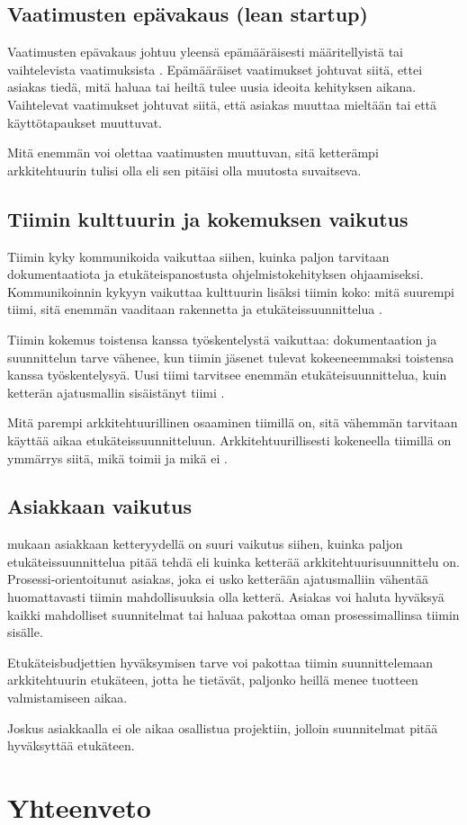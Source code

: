 \section{Vaatimusten epävakaus (lean startup)}
Vaatimusten epävakaus johtuu yleensä epämääräisesti määritellyistä tai vaihtelevista vaatimuksista \citep{waterman_how_2015}. Epämääräiset vaatimukset johtuvat siitä, ettei asiakas tiedä, mitä haluaa tai heiltä tulee uusia ideoita kehityksen aikana. Vaihtelevat vaatimukset johtuvat siitä, että asiakas muuttaa mieltään tai että käyttötapaukset muuttuvat.

Mitä enemmän voi olettaa vaatimusten muuttuvan, sitä ketterämpi arkkitehtuurin tulisi olla eli sen pitäisi olla muutosta suvaitseva.

\section{Tiimin kulttuurin ja kokemuksen vaikutus}
Tiimin kyky kommunikoida vaikuttaa siihen, kuinka paljon tarvitaan dokumentaatiota ja etukäteispanostusta ohjelmistokehityksen ohjaamiseksi. Kommunikoinnin kykyyn vaikuttaa kulttuurin lisäksi tiimin koko: mitä suurempi tiimi, sitä enemmän vaaditaan rakennetta ja etukäteissuunnittelua \citep{waterman_how_2015}.

Tiimin kokemus toistensa kanssa työskentelystä vaikuttaa: dokumentaation ja suunnittelun tarve vähenee, kun tiimin jäsenet tulevat kokeeneemmaksi toistensa kanssa työskentelysyä. Uusi tiimi tarvitsee enemmän etukäteisuunnittelua, kuin ketterän ajatusmallin sisäistänyt tiimi \citep{waterman_how_2015}.

Mitä parempi arkkitehtuurillinen osaaminen tiimillä on, sitä vähemmän tarvitaan käyttää aikaa etukäteissuunnitteluun. Arkkitehtuurillisesti kokeneella tiimillä on ymmärrys siitä, mikä toimii ja mikä ei \citep{waterman_how_2015}.

\section{Asiakkaan vaikutus}
\citep{waterman_how_2015} mukaan asiakkaan ketteryydellä on suuri vaikutus siihen, kuinka paljon etukäteissuunnittelua pitää tehdä eli kuinka ketterää arkkitehtuurisuunnittelu on. Prosessi-orientoitunut asiakas, joka ei usko ketterään ajatusmalliin vähentää huomattavasti tiimin mahdollisuuksia olla ketterä. Asiakas voi haluta hyväksyä kaikki mahdolliset suunnitelmat tai haluaa pakottaa oman prosessimallinsa tiimin sisälle. 

Etukäteisbudjettien hyväksymisen tarve voi pakottaa tiimin suunnittelemaan arkkitehtuurin etukäteen, jotta he tietävät, paljonko heillä menee tuotteen valmistamiseen aikaa. 

Joskus asiakkaalla ei ole aikaa osallistua projektiin, jolloin suunnitelmat pitää hyväksyttää etukäteen.
\chapter{Yhteenveto}
